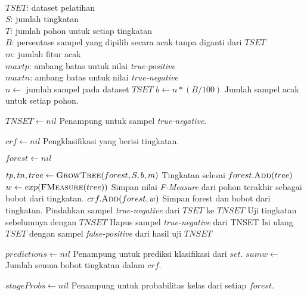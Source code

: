 \begin{center}
	\label{alg:crf}
	\begin{algorithmic}[1]
\Require \\
$ TSET $: dataset pelatihan \\
$ S $: jumlah tingkatan \\
$ T $: jumlah pohon untuk setiap tingkatan \\
$ B $: persentase sampel yang dipilih secara acak tanpa diganti dari $TSET$ \\
$ m $: jumlah fitur acak \\
$ maxtp $: ambang batas untuk nilai \textit{true-positive} \\
$ maxtn $: ambang batas untuk nilai \textit{true-negative}
\\
	\State $ n \gets $ jumlah sampel pada dataset $ TSET $
	\State $ b \gets n * (B / 100) $
	\Comment Jumlah sampel acak untuk setiap pohon.

	\State $ TNSET \gets nil $
	\Comment Penampung untuk sampel \textit{true-negative}.

	\State $ crf \gets nil $
	\Comment Pengklasifikasi yang berisi tingkatan.

		\State $ forest \gets nil $

			\State $ tp, tn, tree \gets \Call{GrowTree}{forest, S, b, m} $
				\State Tingkatan selesai
			\Else
				\State $ forest.\Call{Add}{tree} $
			\EndIf
		\EndFor
		\\
		\State $w \gets exp(\Call{FMeasure}{tree}) $
		\Comment Simpan nilai \textit{F-Measure} dari pohon terakhir sebagai
		bobot dari tingkatan.
		\State $ crf.\Call{Add}{forest, w} $
		\Comment Simpan forest dan bobot dari tingkatan.
			\State Pindahkan sampel \textit{true-negative} dari
			$TSET$ ke $TNSET$
		\Else
			\State Uji tingkatan sebelumnya dengan $TNSET$
			\State Hapus sampel \textit{true-negative} dari TNSET
			\State Isi ulang $TSET$ dengan sampel
			\textit{false-positive} dari hasil uji $TNSET$
		\EndIf
	\EndFor

	\State {}
\EndFunction
\pagebreak
{}
	\State $ predictions \gets nil $
	\Comment Penampung untuk prediksi klasifikasi dari $set$.
	\State $ sumw \gets $ Jumlah semua bobot tingkatan dalam $crf$.

		\State $ stageProbs \gets nil $
		\Comment Penampung untuk probabilitas kelas dari setiap $forest$.


\end{algorithmic}
\end{center}
